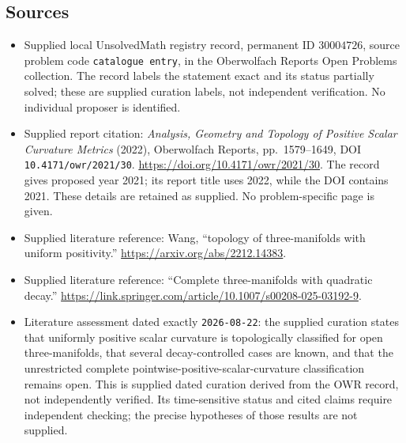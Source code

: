 \documentclass[11pt]{article}
\begin{document}
\subsection{Sources}
\begin{itemize}
\item Supplied local UnsolvedMath registry record, permanent ID \(30004726\), source problem code \texttt{catalogue entry}, in the Oberwolfach Reports Open Problems collection. The record labels the statement exact and its status partially solved; these are supplied curation labels, not independent verification. No individual proposer is identified.
\item Supplied report citation: \emph{Analysis, Geometry and Topology of Positive Scalar Curvature Metrics} (2022), Oberwolfach Reports, pp.~1579--1649, DOI \texttt{10.4171/owr/2021/30}. \url{https://doi.org/10.4171/owr/2021/30}. The record gives proposed year 2021; its report title uses 2022, while the DOI contains 2021. These details are retained as supplied. No problem-specific page is given.
\item Supplied literature reference: Wang, ``topology of three-manifolds with uniform positivity.'' \url{https://arxiv.org/abs/2212.14383}.
\item Supplied literature reference: ``Complete three-manifolds with quadratic decay.'' \url{https://link.springer.com/article/10.1007/s00208-025-03192-9}.
\item Literature assessment dated exactly \texttt{2026-08-22}: the supplied curation states that uniformly positive scalar curvature is topologically classified for open three-manifolds, that several decay-controlled cases are known, and that the unrestricted complete pointwise-positive-scalar-curvature classification remains open. This is supplied dated curation derived from the OWR record, not independently verified. Its time-sensitive status and cited claims require independent checking; the precise hypotheses of those results are not supplied.
\end{itemize}
\end{document}
